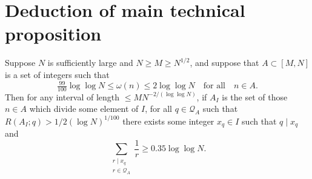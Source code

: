 \chapter{Deduction of main technical proposition}
\label{chap:techprop}

\begin{lemma}\label{lem:find_multiples}
Suppose $N$ is sufficiently large and $N\geq M\geq N^{1/2}$, and suppose that $A\subset [M,N]$ is a set of integers such that
\[\tfrac{99}{100}\log\log N\leq \omega(n)\leq  2\log\log N\quad\textrm{for all}\quad n\in A.\]
Then for any interval of length $\leq MN^{-2/(\log \log N)}$, if $A_I$ is the set of those $n\in A$ which divide some element of $I$, for all $q\in\mathcal{Q}_A$ such that $R(A_I;q)> 1/2(\log N)^{1/100}$ there exists some integer $x_q\in I$ such that $q\mid x_q$ and
\[\sum_{\substack{r\mid x_q\\ r\in \mathcal{Q}_A}}\frac{1}{r}\geq 0.35\log\log N.\]
\end{lemma}
